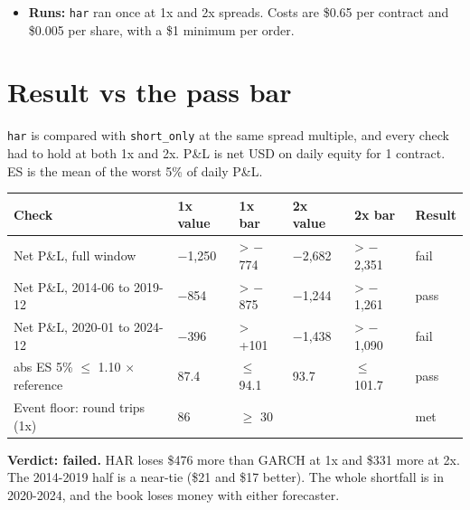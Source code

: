 \documentclass{article}
\begin{document}
\begin{itemize}
\begin{itemize}
\item The baseline (live rules, trial 1) is shown in the charts for context only.

\end{itemize}

\item \textbf{Runs:} \texttt{har} ran once at 1x and 2x spreads. Costs are \$0.65 per contract and \$0.005 per share, with a \$1 minimum per order.

\end{itemize}

\section{Result vs the pass bar}

\texttt{har} is compared with \texttt{short\_\allowbreak{}only} at the same spread multiple, and every check had to hold at both 1x and 2x. P\&L is net USD on daily equity for 1 contract. ES is the mean of the worst 5\% of daily P\&L.

\begin{center}\small
\begin{tabularx}{\linewidth}{>{\raggedright\arraybackslash}X l l l l l}
\toprule
\textbf{Check} & \textbf{1x value} & \textbf{1x bar} & \textbf{2x value} & \textbf{2x bar} & \textbf{Result} \\
\midrule
Net P\&L, full window & \ensuremath{-}1,250 & > \ensuremath{-}774 & \ensuremath{-}2,682 & > \ensuremath{-}2,351 & fail \\
Net P\&L, 2014-06 to 2019-12 & \ensuremath{-}854 & > \ensuremath{-}875 & \ensuremath{-}1,244 & > \ensuremath{-}1,261 & pass \\
Net P\&L, 2020-01 to 2024-12 & \ensuremath{-}396 & > +101 & \ensuremath{-}1,438 & > \ensuremath{-}1,090 & fail \\
abs ES 5\% \ensuremath{\leq} 1.10 \ensuremath{\times} reference & 87.4 & \ensuremath{\leq} 94.1 & 93.7 & \ensuremath{\leq} 101.7 & pass \\
Event floor: round trips (1x) & 86 & \ensuremath{\geq} 30 &  &  & met \\
\bottomrule
\end{tabularx}
\end{center}

\textbf{Verdict: failed.} HAR loses \$476 more than GARCH at 1x and \$331 more at 2x. The 2014-2019 half is a near-tie (\$21 and \$17 better). The whole shortfall is in 2020-2024, and the book loses money with either forecaster.
\end{document}
